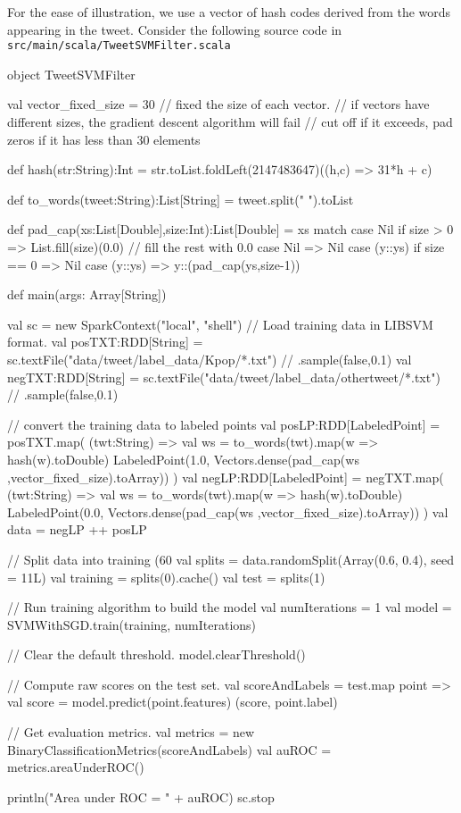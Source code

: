 \documentclass[10pt]{article}
\begin{document}
For the ease of illustration, we use a vector of hash codes derived
from the words appearing in the tweet.  Consider the following source
code in \\ {\tt src/main/scala/TweetSVMFilter.scala} 

\begin{code}
object TweetSVMFilter {

  val vector_fixed_size = 30 
  // fixed the size of each vector. 
  // if vectors have different sizes, the gradient descent algorithm will fail
  // cut off if it exceeds, pad zeros if it has less than 30 elements

  def hash(str:String):Int = str.toList.foldLeft(2147483647)((h,c) => 31*h + c)
  
  def to_words(tweet:String):List[String] = tweet.split(" ").toList

  def pad_cap(xs:List[Double],size:Int):List[Double] = xs match 
  {
    case Nil if size > 0 => List.fill(size)(0.0) // fill the rest with 0.0
    case Nil             => Nil 
    case (y::ys) if size == 0 => Nil
    case (y::ys)              => y::(pad_cap(ys,size-1))
  }

  def main(args: Array[String]) {
     
    val sc = new SparkContext("local", "shell")
    // Load training data in LIBSVM format.
    val posTXT:RDD[String] = sc.textFile("data/tweet/label_data/Kpop/*.txt") // .sample(false,0.1)
    val negTXT:RDD[String] = sc.textFile("data/tweet/label_data/othertweet/*.txt") // .sample(false,0.1)
    
    // convert the training data to labeled points
    val posLP:RDD[LabeledPoint] = posTXT.map( (twt:String) => 
    {
      val ws = to_words(twt).map(w => hash(w).toDouble)
      LabeledPoint(1.0, Vectors.dense(pad_cap(ws ,vector_fixed_size).toArray))
    })
    val negLP:RDD[LabeledPoint] = negTXT.map( (twt:String) => 
    { 
      val ws = to_words(twt).map(w => hash(w).toDouble)
      LabeledPoint(0.0, Vectors.dense(pad_cap(ws ,vector_fixed_size).toArray))
    })
    val data = negLP ++ posLP

    // Split data into training (60%
    val splits = data.randomSplit(Array(0.6, 0.4), seed = 11L)
    val training = splits(0).cache()
    val test = splits(1)

    // Run training algorithm to build the model
    val numIterations = 1
    val model = SVMWithSGD.train(training, numIterations)

    // Clear the default threshold.
    model.clearThreshold()

    // Compute raw scores on the test set. 
    val scoreAndLabels = test.map { point =>
      val score = model.predict(point.features)
      (score, point.label)
    }

    // Get evaluation metrics.
    val metrics = new BinaryClassificationMetrics(scoreAndLabels)
    val auROC = metrics.areaUnderROC()

    println("Area under ROC = " + auROC)	
    sc.stop
  }
}
\end{code}
\end{document}

